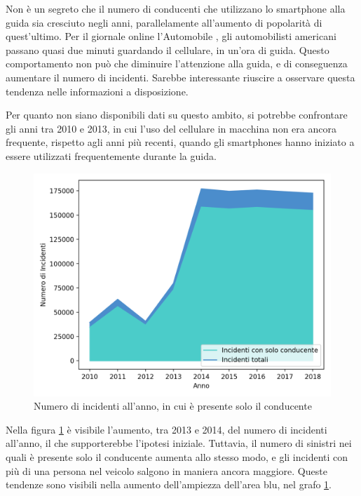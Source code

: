 \documentclass[a4paper,12pt]{report}
\begin{document}
Non è un segreto che il numero di conducenti che utilizzano lo smartphone alla guida 
sia cresciuto negli anni, parallelamente all'aumento di popolarità di quest'ultimo. 
Per il giornale online l'Automobile \cite{AUTOMOBILE:1}, gli automobilisti americani 
passano quasi due minuti guardando il cellulare, in un'ora di guida.
Questo comportamento non può che diminuire l'attenzione alla guida, e di conseguenza 
aumentare il numero di incidenti. 
Sarebbe interessante riuscire a osservare questa tendenza nelle informazioni a disposizione.

Per quanto non siano disponibili dati su questo ambito, si potrebbe confrontare gli 
anni tra 2010 e 2013, in cui l'uso del cellulare in macchina non era ancora frequente, 
rispetto agli anni più recenti, quando gli smartphones hanno iniziato a essere utilizzati 
frequentemente durante la guida.

\begin{figure}
    \includegraphics[width=\linewidth]{../src/incidenti/incidenti_senza_coords/anno/incremento_incidenti.png}
    \caption{Numero di incidenti all'anno, in cui è presente solo il conducente}
    \label{fig:incremento-incidenti}
\end{figure}

Nella figura \ref{fig:incremento-incidenti} è visibile l'aumento, tra 2013 e 2014, del 
numero di incidenti all'anno, il che supporterebbe l'ipotesi iniziale.
Tuttavia, il numero di sinistri nei quali è presente solo il conducente 
aumenta allo stesso modo, e gli incidenti con più di una persona nel veicolo 
salgono in maniera ancora maggiore. 
Queste tendenze sono visibili nella aumento dell'ampiezza dell'area blu, nel grafo 
\ref{fig:incremento-incidenti}.
\end{document}

